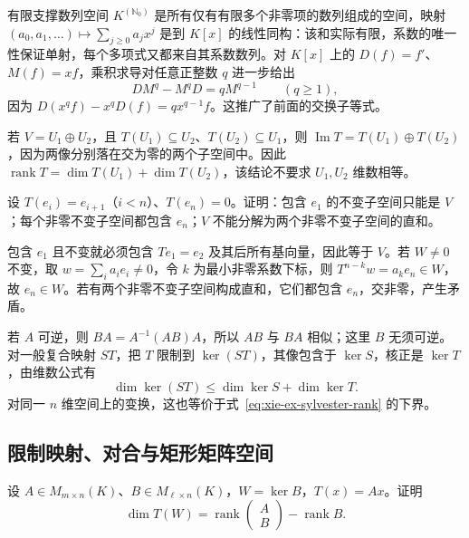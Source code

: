 有限支撑数列空间 $K^{(\mathbb N_0)}$ 是所有仅有有限多个非零项的数列组成的空间，映射 $(a_0,a_1,\ldots)\mapsto\sum_{j\geq0}a_jx^j$ 是到 $K[x]$ 的线性同构：该和实际有限，系数的唯一性保证单射，每个多项式又都来自其系数数列。对 $K[x]$ 上的 $D(f)=f'$、$M(f)=xf$，乘积求导对任意正整数 $q$ 进一步给出
\[
    DM^q-M^qD=qM^{q-1}\qquad(q\geq1),
\]
因为 $D(x^qf)-x^qD(f)=qx^{q-1}f$。这推广了前面的交换子等式。

若 $V=U_1\oplus U_2$，且 $T(U_1)\subseteq U_2$、$T(U_2)\subseteq U_1$，则 $\operatorname{Im}T=T(U_1)\oplus T(U_2)$，因为两像分别落在交为零的两个子空间中。因此 $\operatorname{rank}T=\dim T(U_1)+\dim T(U_2)$，该结论不要求 $U_1,U_2$ 维数相等。

\begin{example}
\label{ex:xie-ex-cyclic-nilpotent-invariant}
设 $T(e_i)=e_{i+1}$（$i<n$）、$T(e_n)=0$。证明：包含 $e_1$ 的不变子空间只能是 $V$；每个非零不变子空间都包含 $e_n$；$V$ 不能分解为两个非零不变子空间的直和。
\end{example}

\begin{solve}
包含 $e_1$ 且不变就必须包含 $Te_1=e_2$ 及其后所有基向量，因此等于 $V$。若 $W\ne0$ 不变，取 $w=\sum_i a_ie_i\ne0$，令 $k$ 为最小非零系数下标，则 $T^{n-k}w=a_ke_n\in W$，故 $e_n\in W$。若有两个非零不变子空间构成直和，它们都包含 $e_n$，交非零，产生矛盾。
\end{solve}

若 $A$ 可逆，则 $BA=A^{-1}(AB)A$，所以 $AB$ 与 $BA$ 相似；这里 $B$ 无须可逆。对一般复合映射 $ST$，把 $T$ 限制到 $\ker(ST)$，其像包含于 $\ker S$，核正是 $\ker T$，由维数公式有
\begin{equation}
\label{eq:xie-ex-product-nullity}
    \dim\ker(ST)\leq\dim\ker S+\dim\ker T.
\end{equation}
对同一 $n$ 维空间上的变换，这也等价于式~\eqref{eq:xie-ex-sylvester-rank} 的下界。

\subsection{限制映射、对合与矩形矩阵空间}

\begin{example}
\label{ex:xie-ex-restricted-matrix-image}
设 $A\in M_{m\times n}(K)$、$B\in M_{\ell\times n}(K)$，$W=\ker B$，$T(x)=Ax$。证明
\[
    \dim T(W)=\operatorname{rank}\begin{pmatrix}A\\B\end{pmatrix}
    -\operatorname{rank}B.
\]
\end{example}


